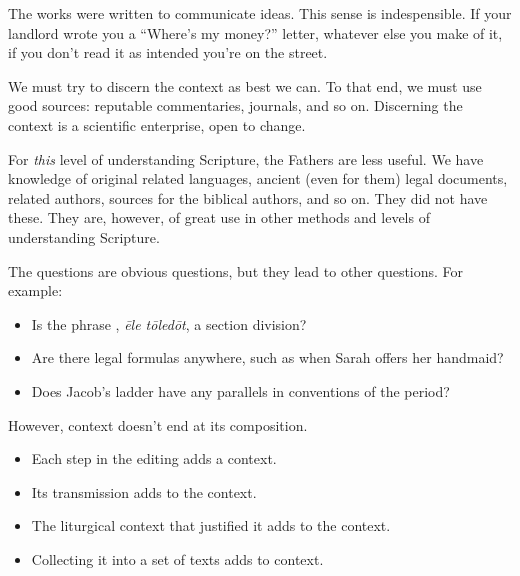 \documentclass{beamer}
\begin{document}
\begin{frame}
  The works were written to communicate ideas.
  This sense is indespensible.
  If your landlord wrote you a ``Where's my money?'' letter, whatever else you make of it, if you don't read it as intended you're on the street.
\end{frame}

\begin{frame}
  We must try to discern the context as best we can.
  To that end, we must use good sources: reputable commentaries, journals, and so on.
  Discerning the context is a scientific enterprise, open to change.
\end{frame}

\begin{frame}
  For \emph{this} level of understanding Scripture, the Fathers are less useful.
  We have knowledge of original related languages, ancient (even for them) legal documents, related authors, sources for the biblical authors, and so on.
  They did not have these.
  They are, however, of great use in other methods and levels of understanding Scripture.
\end{frame}

\begin{frame}
  The questions are obvious questions, but they lead to other questions.
  For example:
  \begin{itemize}
	\item Is the phrase , \emph{ēle tōl\scriptsize e\normalsize dōt}, a section division?\pause
	\item Are there legal formulas anywhere, such as when Sarah offers her handmaid?\pause
	\item Does Jacob's ladder have any parallels in conventions of the period?
  \end{itemize}
\end{frame}

\begin{frame}
  However, context doesn't end at its composition.\pause
  \begin{itemize}
	\item Each step in the editing adds a context.\pause
	\item Its transmission adds to the context.\pause
	\item The liturgical context that justified it adds to the context.\pause
	\item Collecting it into a set of texts adds to context.
  \end{itemize}
\end{frame}
\end{document}
